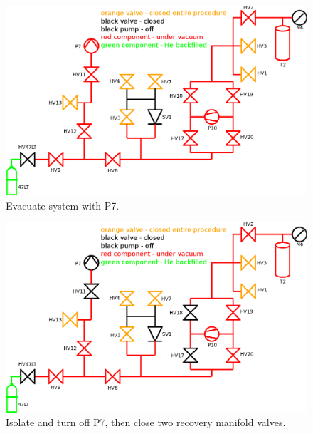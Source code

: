\documentclass[a4paper,10pt]{article}
\begin{document}
\begin{figure}[htbp!]
 \centering
 \includegraphics[width=\textwidth]{./he-3-transfer-04-evac-system-with-p7.png}
 \caption{Evacuate system with P7.}
 \label{b}
\end{figure}
\begin{figure}[htbp!]
 \centering
 \includegraphics[width=\textwidth]{./he-3-transfer-05-kill-p7.png}
 \caption{Isolate and turn off P7, then close two recovery manifold valves.}
 \label{c}
\end{figure}
\end{document}
